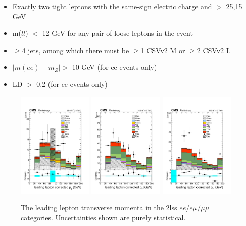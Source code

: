 \begin{itemize}
 \item Exactly two tight leptons with the same-sign electric charge and \pt $>$ 25,15 GeV
 \item m($ll$) $<$ 12 GeV for any pair of loose leptons in the event
 \item $\geq$4 jets, among which there must be $\geq$1 CSVv2 M or $\geq$2 CSVv2 L
 \item $|m(ee)-m_{Z}| >$ 10 GeV (for ee events only)
 \item \met LD $>$ 0.2 (for ee events only) 
\end{itemize}

\begin{figure}[htp]
\centering
\includegraphics[width=0.32\textwidth]{ch5_figs/l1_pt_ttH_ee_stackPlot_SR.pdf}
\includegraphics[width=0.32\textwidth]{ch5_figs/l1_pt_ttH_em_stackPlot_SR.pdf}
\includegraphics[width=0.32\textwidth]{ch5_figs/l1_pt_ttH_mm_stackPlot_SR.pdf} \\
\caption[Data/MC comparison of leading lepton \pt in the signal region]{The leading lepton transverse momenta in the 2lss $ee$/$e\mu$/$\mu\mu$ categories. Uncertainties shown are purely statistical.}
\label{fig:sr_l1pt}
\end{figure}


